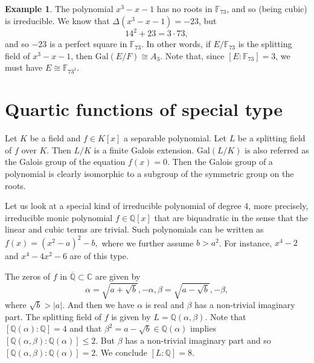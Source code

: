\documentclass[12pt]{report}
\theoremstyle{definition}
\newtheorem{example}[theorem]{Example}
\newcommand{\Gal}{\text{Gal}}
\newcommand{\CC}{\mathbb{C}}
\newcommand{\QQ}{\mathbb{Q}}
\newcommand{\FF}{\mathbb{F}}
\begin{document}
\begin{example}
	The polynomial $x^3 -x-1$ has no roots in $\FF_{73}$, and so (being cubic) is irreducible. We know that $\Delta(x^3 - x - 1) = -23$, but
	$$14^2 + 23 = 3 \cdot 73,$$ and so $-23$ is a perfect square in $\FF_{73}$. In other words, if $E/\FF_{73}$ is the splitting field of $x^3 - x - 1$, then $\Gal(E/F) \cong A_3$. Note that, since $[E : \FF_{73}] = 3$, we must have $E \cong \FF_{73^3}$.
\end{example}

\section{Quartic functions of special type}

Let $K$ be a field and $f\in K[x]$ a separable polynomial. Let $L$ be a splitting field of $f$ over $K$. Then $L/K$ is a finite Galois extension. $\Gal(L/K)$ is also referred as the Galois group of the equation $f(x)=0$. Then the Galois group of a polynomial is clearly isomorphic to a subgroup of the symmetric group on the roots.

Let us look at a special kind of irreducible polynomial of degree 4, more precisely, irreducible monic polynomial $f\in \QQ[x]$ that are biquadratic in the sense that the linear and cubic terms are trivial. Such polynomials can be written as $f(x)=(x^2-a)^2-b,$ where we further assume $b>a^2$. For instance, $x^4-2$ and $x^4-4x^2-6$ are of this type.

The zeros of $f$ in $\overline{\QQ}\subset \CC$ are given by
$$\alpha=\sqrt{a+\sqrt{b}},-\alpha,\beta=\sqrt{a-\sqrt{b}},-\beta,$$ where $\sqrt{b}>|a|$. And then we have $\alpha$ is real and $\beta$ has a non-trivial imaginary part. The splitting field of $f$ is given by $L=\QQ(\alpha,\beta)$. Note that $[\QQ(\alpha):\QQ]=4$ and that $\beta^2=a-\sqrt{b}\in \QQ(\alpha)$ implies $[\QQ(\alpha,\beta):\QQ(\alpha)]\leq 2$. But $\beta$ has a non-trivial imaginary part and so $[\QQ(\alpha,\beta):\QQ(\alpha)]=2$. We conclude $[L:\QQ]=8$.
\end{document}
